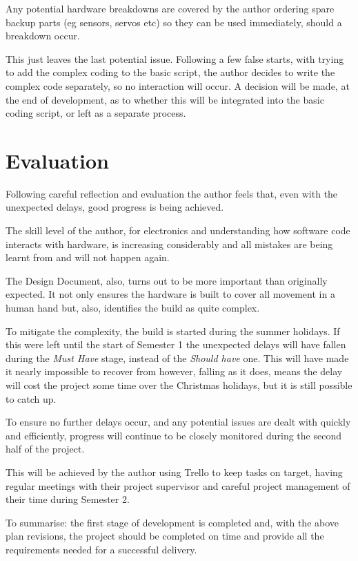 \documentclass[progress]{cmpreport}
\begin{document}
{{{{{{Any potential hardware breakdowns are covered by the author ordering spare backup parts (eg sensors, servos etc) so they can be used immediately, should a breakdown occur. 

This just leaves the last potential issue. Following a few false starts, with trying to add the complex coding to the basic script, the author  decides to write the complex code separately, so no interaction will occur. A decision will be made, at the end of development, as to whether this will be integrated into the basic coding script, or left as a separate process.


\section{Evaluation}
Following careful reflection and evaluation the author feels that, even with the unexpected delays, good progress is being achieved. 

The skill level of the author, for electronics and understanding how software code interacts with hardware, is increasing considerably and all mistakes are being learnt from and will not happen again.

The Design Document, also, turns out to be more important than originally expected. It not only ensures the hardware is built to cover all movement in a human hand but, also, identifies the build as quite complex. 

To mitigate the complexity, the build is started during the summer holidays. If this were left until the start of Semester 1 the unexpected delays will have fallen during the \textit{Must Have} stage, instead of the \textit{Should have} one. This will have made it nearly impossible to recover from however, falling as it does, means the delay will cost the project some time over the Christmas holidays, but it is still possible to catch up.

To ensure no further delays occur, and any potential issues are dealt with quickly and efficiently, progress will continue to be closely monitored during the second half of the project. 

This will be achieved by the author using Trello to keep tasks on target, having regular meetings with their project supervisor and careful project management of their time during Semester 2.

To summarise: the first stage of development is completed and, with the above plan revisions, the project should be completed on time and provide all the requirements needed for a successful delivery.

}}}}}}
\end{document}
